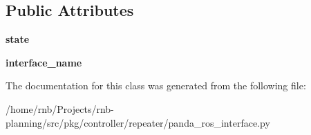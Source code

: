 \subsection*{Public Attributes}
\begin{DoxyCompactItemize}
\item 
\mbox{\label{classrnb-planning_1_1src_1_1pkg_1_1controller_1_1repeater_1_1panda__ros__interface_1_1_panda_state_subscriber_a5a2627f5d3cd53ea8fc19780c925eab6}} 
{\bfseries state}
\item 
\mbox{\label{classrnb-planning_1_1src_1_1pkg_1_1controller_1_1repeater_1_1panda__ros__interface_1_1_panda_state_subscriber_aaba28733f213c660dd03478e9f889f56}} 
{\bfseries interface\+\_\+name}
\end{DoxyCompactItemize}


The documentation for this class was generated from the following file\+:\begin{DoxyCompactItemize}
\item 
/home/rnb/\+Projects/rnb-\/planning/src/pkg/controller/repeater/panda\+\_\+ros\+\_\+interface.\+py\end{DoxyCompactItemize}
